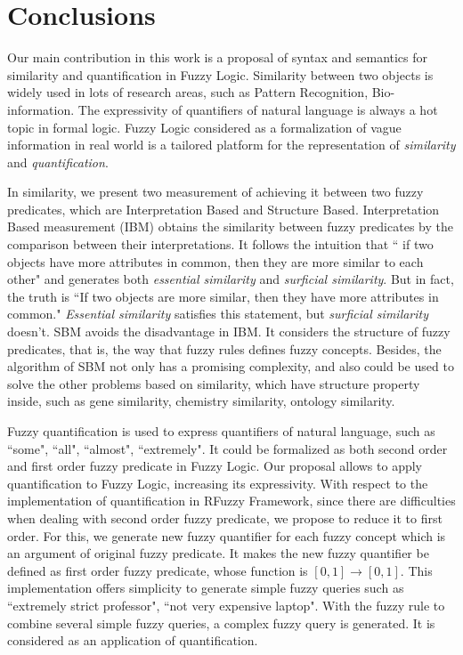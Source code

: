 \documentclass[Thesis.tex]{subfiles}
\begin{document}
\section{Conclusions}
\label{chap:Conclusions}

Our main contribution in this work is a proposal of syntax and semantics for similarity and quantification in Fuzzy Logic.
Similarity between two objects is widely used in lots of research areas, such as Pattern Recognition, Bio-information. The expressivity of quantifiers of natural language is always a hot topic in formal logic. Fuzzy Logic considered as a formalization of vague information in real world is a tailored platform for the representation of \textit{similarity} and \textit{quantification}. 

In similarity, we present two measurement of achieving it between two fuzzy predicates, which are Interpretation Based and Structure Based. Interpretation Based measurement (IBM) obtains the similarity between fuzzy predicates by the comparison between their interpretations. 
It follows the intuition that `` if two objects have more attributes in common, then they are more similar to each other" and generates both \textit{essential similarity} and \textit{surficial similarity}.
But in fact, the truth is ``If two objects are more similar, then they have more attributes in common." 
\textit{Essential similarity} satisfies this statement, but \textit{surficial similarity} doesn't. SBM avoids the disadvantage in IBM. It considers the structure of fuzzy predicates, that is, the way that fuzzy rules defines fuzzy concepts. Besides, the algorithm of SBM not only has a promising complexity, and also could be used to solve the other problems based on similarity, which have structure property inside, such as gene similarity, chemistry similarity, ontology similarity.

Fuzzy quantification is used to express quantifiers of natural language, such as ``some", ``all", ``almost", ``extremely". It could be formalized as both second order and first order fuzzy predicate in Fuzzy Logic. Our proposal allows to apply quantification to Fuzzy Logic, increasing its expressivity. 
With respect to the implementation of quantification in RFuzzy Framework,  since there are difficulties when dealing with second order fuzzy predicate, we propose to reduce it to first order.  For this, we generate new fuzzy quantifier for each fuzzy concept which is an argument of original fuzzy predicate. It makes the new fuzzy quantifier be defined as first order fuzzy predicate, whose function is $[0,1] \rightarrow [0,1]$. This implementation offers simplicity to generate simple fuzzy queries such as ``extremely strict professor", ``not very expensive laptop". With the fuzzy rule to combine several simple fuzzy queries, a complex fuzzy query is generated. It is considered as an application of quantification.
\end{document}
